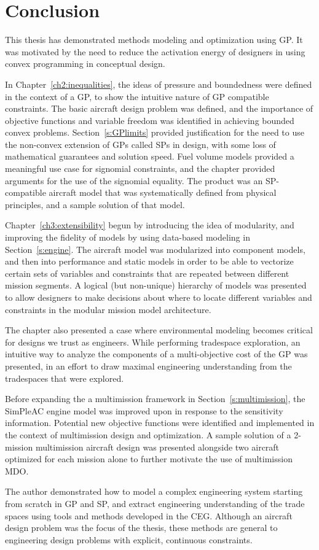\chapter{Conclusion}
\label{ch5:conclusion}

This thesis has demonstrated methods modeling and optimization using \gls{GP}. It
was motivated by the need to reduce the activation energy of designers in using
convex programming in conceptual design.

In Chapter~\ref{ch2:inequalities}, the ideas of pressure and boundedness were
defined in the context of a \gls{GP}, to show the intuitive nature of \gls{GP}
compatible constraints. The basic aircraft design problem was defined,
and the importance of objective functions and variable freedom
was identified in achieving bounded convex problems.
Section~\ref{s:GPlimits} provided justification for the need to use the non-convex
extension of \gls{GP}s called \gls{SP}s in design, with some loss of mathematical
guarantees and solution speed. Fuel volume models provided a meaningful use
case for signomial constraints, and the chapter provided arguments for the use of the signomial
equality. The product was an \gls{SP}-compatible aircraft model that was systematically defined from
physical principles, and a sample solution of that model.

Chapter~\ref{ch3:extensibility} begun by introducing the idea of modularity, and improving
the fidelity of models by using data-based modeling in Section~\ref{s:engine}.
The aircraft model was modularized
into component models, and then into performance and static models in order to
be able to vectorize certain sets of variables and constraints that are repeated between
different mission segments. A logical (but non-unique) hierarchy of models
was presented to allow designers to make decisions about where to locate different variables
and constraints in the modular mission model architecture.

The chapter also presented a case where environmental modeling becomes critical
for designs we trust as engineers. While performing tradespace exploration, an intuitive
way to analyze the components of a multi-objective cost of the \gls{GP} was presented, in
an effort to draw maximal engineering understanding from the tradespaces that were explored.

Before expanding the a multimission framework in Section~\ref{s:multimission},
the SimPleAC engine model was improved upon
in response to the sensitivity information. Potential
new objective functions were identified and implemented in the context of multimission design
and optimization.
A sample solution of a 2-mission multimission aircraft design
was presented alongside two aircraft optimized for each mission alone to further motivate
the use of multimission \gls{MDO}.

The author demonstrated how to model a complex engineering system
starting from scratch in \gls{GP} and \gls{SP}, and extract engineering understanding of
the trade spaces using tools and methods developed in the \gls{CEG}.
Although an aircraft design problem was the focus of the thesis,
these methods are general to engineering design problems with explicit, continuous constraints.
